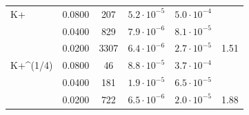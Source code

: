 \begin{tabular}{lccccc}
\midrule
K+ & 0.0800 & 207 & $5.2\cdot 10^{-5}$ & $5.0\cdot 10^{-4}$ &  \\
 & 0.0400 & 829 & $7.9\cdot 10^{-6}$ & $8.1\cdot 10^{-5}$ &  \\
 & 0.0200 & 3307 & $6.4\cdot 10^{-6}$ & $2.7\cdot 10^{-5}$ & 1.51 \\
\midrule
K+\^{}(1/4) & 0.0800 & 46 & $8.8\cdot 10^{-5}$ & $3.7\cdot 10^{-4}$ &  \\
 & 0.0400 & 181 & $1.9\cdot 10^{-5}$ & $6.5\cdot 10^{-5}$ &  \\
 & 0.0200 & 722 & $6.5\cdot 10^{-6}$ & $2.0\cdot 10^{-5}$ & 1.88 \\
\bottomrule
\end{tabular}
